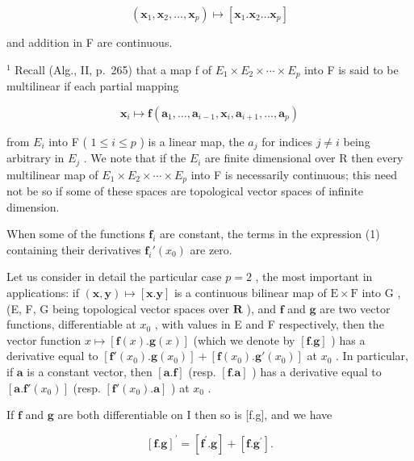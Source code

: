 \[
(\mathbf {x} _ {1}, \mathbf {x} _ {2}, \dots , \mathbf {x} _ {p}) \mapsto [ \mathbf {x} _ {1}. \mathbf {x} _ {2} \dots \mathbf {x} _ {p} ]
\]

and addition in F are continuous.

\(^{1}\) Recall (Alg., II, p.~265) that a map f of \(E_{1} \times E_{2} \times \cdots \times E_{p}\) into F is said to be multilinear if each partial mapping

\[
\mathbf {x} _ {i} \mapsto \mathbf {f} (\mathbf {a} _ {1}, \dots , \mathbf {a} _ {i - 1}, \mathbf {x} _ {i}, \mathbf {a} _ {i + 1}, \dots , \mathbf {a} _ {p})
\]

from \(E_{i}\) into F ( \(1 \leqslant i \leqslant p\) ) is a linear map, the \(a_{j}\) for indices \(j \neq i\) being arbitrary in \(E_{j}\) . We note that if the \(E_{i}\) are finite dimensional over R then every multilinear map of \(E_{1} \times E_{2} \times \cdots \times E_{p}\) into F is necessarily continuous; this need not be so if some of these spaces are topological vector spaces of infinite dimension.

When some of the functions \(\mathbf{f}_i\) are constant, the terms in the expression (1) containing their derivatives \(\mathbf{f}_i'(x_0)\) are zero.

Let us consider in detail the particular case \(p = 2\) , the most important in applications: if \((\mathbf{x}, \mathbf{y}) \mapsto [\mathbf{x}.\mathbf{y}]\) is a continuous bilinear map of \(\mathrm{E} \times \mathrm{F}\) into \(\mathrm{G}\) , (E, F, G being topological vector spaces over \(\mathbf{R}\) ), and \(\mathbf{f}\) and \(\mathbf{g}\) are two vector functions, differentiable at \(x_0\) , with values in E and F respectively, then the vector function \(x \mapsto [\mathbf{f}(x).\mathbf{g}(x)]\) (which we denote by \([\mathbf{f}.\mathbf{g}]\) ) has a derivative equal to \([\mathbf{f}'(x_0).\mathbf{g}(x_0)] + [\mathbf{f}(x_0).\mathbf{g}'(x_0)]\) at \(x_0\) . In particular, if \(\mathbf{a}\) is a constant vector, then \([\mathbf{a}.\mathbf{f}]\) (resp. \([\mathbf{f}.\mathbf{a}]\) ) has a derivative equal to \([\mathbf{a}.\mathbf{f}'(x_0)]\) (resp. \([\mathbf{f}'(x_0).\mathbf{a}]\) ) at \(x_0\) .

If \(\mathbf{f}\) and \(\mathbf{g}\) are both differentiable on I then so is {[}f.g{]}, and we have

\[
\left[ \mathbf {f}. \mathbf {g} \right] ^ {\prime} = \left[ \mathbf {f} ^ {\prime}. \mathbf {g} \right] + \left[ \mathbf {f}. \mathbf {g} ^ {\prime} \right].\tag{2}
\]

